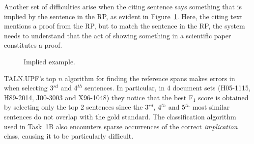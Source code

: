 \documentclass[11pt]{article}
\begin{document}
Another set of difficulties arise when the citing sentence says
something that is implied by the sentence in the RP, as evident in
Figure~\ref{f:3}.  Here, the citing text mentions a proof from the RP,
but to match the sentence in the RP, the system needs to understand
that the act of showing something in a scientific paper constitutes a
proof.

\begin{figure}[h]
\noindent{}
\caption{Implied example.}
\label{f:3}
\end{figure}

TALN.UPF's top $n$ algorithm for finding the reference spans makes
errors in when selecting 3$^{rd}$ and 4$^{th}$ sentences. In
particular, in 4 document sets (H05-1115, H89-2014, J00-3003 and
X96-1048) they notice that the best F$_1$ score is obtained by
selecting only the top 2 sentences since the 3$^{rd}$, 4$^{th}$ and
5$^{th}$ most similar sentences do not overlap with the gold
standard. The classification algorithm used in Task~1B also encounters
sparse occurrences of the correct \textit{implication} class, causing
it to be particularly difficult.
\end{document}
